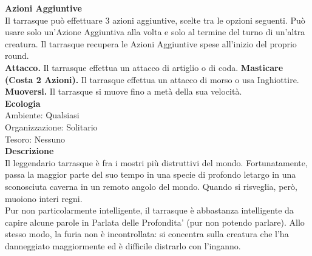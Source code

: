 \begin{multicols}{2}
\textbf{Azioni Aggiuntive}\\
Il tarrasque può effettuare 3 azioni aggiuntive, scelte tra le opzioni seguenti. Può usare solo un'Azione Aggiuntiva alla volta e solo al termine del turno di un'altra creatura. Il tarrasque recupera le Azioni Aggiuntive spese all'inizio del proprio round.\\
\textbf{Attacco.} Il tarrasque effettua un attacco di artiglio o di coda. \textbf{Masticare (Costa 2 Azioni).} Il tarrasque effettua un attacco di morso o usa Inghiottire.\\
\textbf{Muoversi.} Il tarrasque si muove fino a metà della sua velocità.\\
\textbf{Ecologia}\\
Ambiente: Qualsiasi\\
Organizzazione: Solitario\\
Tesoro: Nessuno\\
\textbf{Descrizione}\\
Il leggendario tarrasque è fra i mostri più distruttivi del mondo. Fortunatamente, passa la maggior parte del suo tempo in una specie di profondo letargo in una sconosciuta caverna in un remoto angolo del mondo. Quando si risveglia, però, muoiono interi regni.\\
Pur non particolarmente intelligente, il tarrasque è abbastanza intelligente da capire alcune parole in Parlata delle Profondita' (pur non potendo parlare). Allo stesso modo, la furia non è incontrollata: si concentra sulla creatura che l’ha danneggiato maggiormente ed è difficile distrarlo con l’inganno.\\


\end{multicols}
